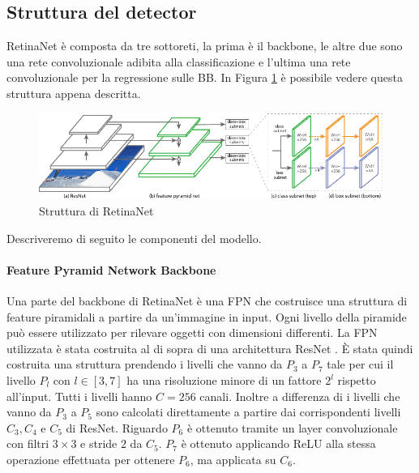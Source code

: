 \subsection{Struttura del detector}
\label{subsec:retinanet_structure}
RetinaNet è composta da tre sottoreti, la prima è il backbone, le altre due sono una rete convoluzionale adibita alla classificazione e l'ultima una rete convoluzionale per la regressione sulle \ac{BB}. In Figura \ref{fig:retinanet_structure} è possibile vedere questa struttura appena descritta.
\begin{figure}
    \centering
    \includegraphics[width=\textwidth]{images/retinanet_net.pdf}
    \caption{Struttura di RetinaNet}
    \label{fig:retinanet_structure}
\end{figure}
Descriveremo di seguito le componenti del modello.
\paragraph{Feature Pyramid Network Backbone}
Una parte del backbone di RetinaNet è una \ac{FPN} \cite{lin2017feature} che costruisce una struttura di feature piramidali a partire da un'immagine in input. Ogni livello della piramide può essere utilizzato per rilevare oggetti con dimensioni differenti. 
La \ac{FPN} utilizzata è stata costruita al di sopra di una architettura ResNet \cite{he2016deep}. È stata quindi costruita una struttura prendendo i livelli che vanno da $P_3$ a $P_7$ tale per cui il livello $P_l$ con $l \in [3, 7]$ ha una risoluzione minore di un fattore $2^l$ rispetto all'input. Tutti i livelli hanno $C=256$ canali. Inoltre a differenza di \cite{lin2017feature} i livelli che vanno da $P_3$ a $P_5$ sono calcolati direttamente a partire dai corrispondenti livelli $C_3, C_4$ e $C_5$ di ResNet. Riguardo $P_6$ è ottenuto tramite un layer convoluzionale con filtri $3 \times 3$ e stride $2$ da $C_5$. $P_7$ è ottenuto applicando ReLU alla stessa operazione effettuata per ottenere $P_6$, ma applicata su $C_6$.

